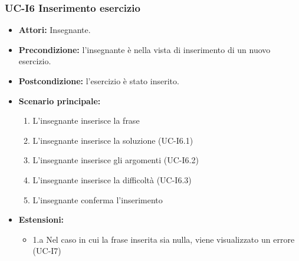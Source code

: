 \subsubsection{UC-I6 Inserimento esercizio}
	\begin{itemize}
		\item \textbf{Attori: }Insegnante.
		\item \textbf{Precondizione: }l'insegnante è nella vista di inserimento di un nuovo esercizio.
		\item \textbf{Postcondizione: }l'esercizio è stato inserito.
		\item \textbf{Scenario principale: }
			\begin{enumerate} 
				\item L'insegnante inserisce la frase
				\item L'insegnante inserisce la soluzione (UC-I6.1)
				\item L'insegnante inserisce gli argomenti (UC-I6.2)
				\item L'insegnante inserisce la difficoltà (UC-I6.3)
				\item L'insegnante conferma l'inserimento
			\end{enumerate}
		\item \textbf{Estensioni:} 
			\begin{itemize}
				\item 1.a Nel caso in cui la frase inserita sia nulla, viene visualizzato un errore (UC-I7)
			\end{itemize}
	\end{itemize}
	
